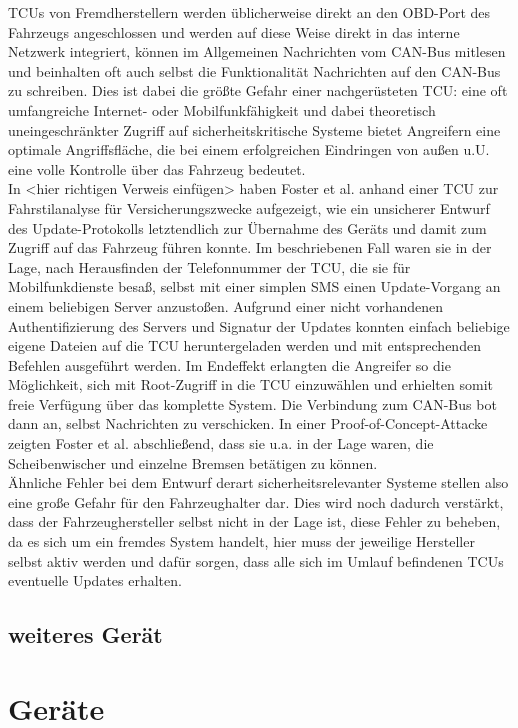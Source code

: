 \documentclass[
    fontsize=12pt,
    headings=small,
    parskip=half,           %
    bibliography=totoc,9
    numbers=noenddot,       %
    open=any,               %
    ]{scrreprt}
\begin{document}
TCUs von Fremdherstellern werden üblicherweise direkt an den OBD-Port des Fahrzeugs angeschlossen und werden auf diese Weise direkt in das interne Netzwerk integriert, können im Allgemeinen Nachrichten vom CAN-Bus mitlesen und beinhalten oft auch selbst die Funktionalität Nachrichten auf den CAN-Bus zu schreiben.
Dies ist dabei die größte Gefahr einer nachgerüsteten TCU: eine oft umfangreiche Internet- oder Mobilfunkfähigkeit und dabei theoretisch uneingeschränkter Zugriff auf sicherheitskritische Systeme bietet Angreifern eine optimale Angriffsfläche, die bei einem erfolgreichen Eindringen von außen u.U. eine volle Kontrolle über das Fahrzeug bedeutet. \\
In <hier richtigen Verweis einfügen> haben Foster et al. anhand einer TCU zur Fahrstilanalyse für Versicherungszwecke aufgezeigt, wie ein unsicherer Entwurf des Update-Protokolls letztendlich zur Übernahme des Geräts und damit zum Zugriff auf das Fahrzeug führen konnte. Im beschriebenen Fall waren sie in der Lage, nach Herausfinden der Telefonnummer der TCU, die sie für Mobilfunkdienste besaß, selbst mit einer simplen SMS einen Update-Vorgang an einem beliebigen Server anzustoßen.
Aufgrund einer nicht vorhandenen Authentifizierung des Servers und Signatur der Updates konnten einfach beliebige eigene Dateien auf die TCU heruntergeladen werden und mit entsprechenden Befehlen ausgeführt werden. Im Endeffekt erlangten die Angreifer so die Möglichkeit, sich mit Root-Zugriff in die TCU einzuwählen und erhielten somit freie Verfügung über das komplette System. Die Verbindung zum CAN-Bus bot dann an, selbst Nachrichten zu verschicken. In einer Proof-of-Concept-Attacke zeigten Foster et al. abschließend, dass sie u.a. in der Lage waren, die Scheibenwischer und einzelne Bremsen betätigen zu können. \\
Ähnliche Fehler bei dem Entwurf derart sicherheitsrelevanter Systeme stellen also eine große Gefahr für den Fahrzeughalter dar. Dies wird noch dadurch verstärkt, dass der Fahrzeughersteller selbst nicht in der Lage ist, diese Fehler zu beheben, da es sich um ein fremdes System handelt, hier muss der jeweilige Hersteller selbst aktiv werden und dafür sorgen, dass alle sich im Umlauf befindenen TCUs eventuelle Updates erhalten.


\subsection{weiteres Gerät}


\section{Geräte}
\end{document}
